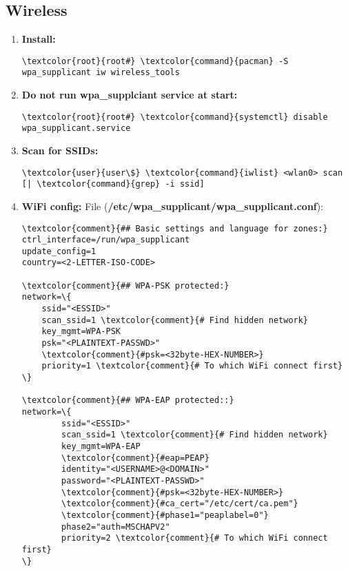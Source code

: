 \documentclass[10pt, a4paper, onecolumn, openany]{book} %
\begin{document}
\subsection{Wireless}
\begin{enumerate}
    \item \textbf{Install:}
\begin{Verbatim}[commandchars=\\\{\}]
\textcolor{root}{root#} \textcolor{command}{pacman} -S wpa_supplicant iw wireless_tools
\end{Verbatim} 
    \item \textbf{Do not run wpa\_supplciant service at start:}
\begin{Verbatim}[commandchars=\\\{\}]
\textcolor{root}{root#} \textcolor{command}{systemctl} disable wpa_supplicant.service
\end{Verbatim} 
    \item \textbf{Scan for SSIDs:}
\begin{Verbatim}[commandchars=\\\{\}]
\textcolor{user}{user\$} \textcolor{command}{iwlist} <wlan0> scan [| \textcolor{command}{grep} -i ssid]
\end{Verbatim}

    \item \textbf{WiFi config:}
\newline File (\textbf{\textcolor{file}{/etc/wpa\_supplicant/wpa\_supplicant.conf}}):
\begin{Verbatim}[commandchars=\\\{\}]
\textcolor{comment}{## Basic settings and language for zones:}
ctrl_interface=/run/wpa_supplicant
update_config=1
country=<2-LETTER-ISO-CODE>

\textcolor{comment}{## WPA-PSK protected:}
network=\{
    ssid="<ESSID>"
    scan_ssid=1 \textcolor{comment}{# Find hidden network}
    key_mgmt=WPA-PSK
    psk="<PLAINTEXT-PASSWD>"
    \textcolor{comment}{#psk=<32byte-HEX-NUMBER>}
    priority=1 \textcolor{comment}{# To which WiFi connect first}
\}

\textcolor{comment}{## WPA-EAP protected::}
network=\{
        ssid="<ESSID>"
        scan_ssid=1 \textcolor{comment}{# Find hidden network}
        key_mgmt=WPA-EAP
        \textcolor{comment}{#eap=PEAP}
        identity="<USERNAME>@<DOMAIN>"
        password="<PLAINTEXT-PASSWD>"
        \textcolor{comment}{#psk=<32byte-HEX-NUMBER>}
        \textcolor{comment}{#ca_cert="/etc/cert/ca.pem"}
        \textcolor{comment}{#phase1="peaplabel=0"}
        phase2="auth=MSCHAPV2"
        priority=2 \textcolor{comment}{# To which WiFi connect first}
\}


\end{Verbatim}
\end{enumerate}
\end{document}
